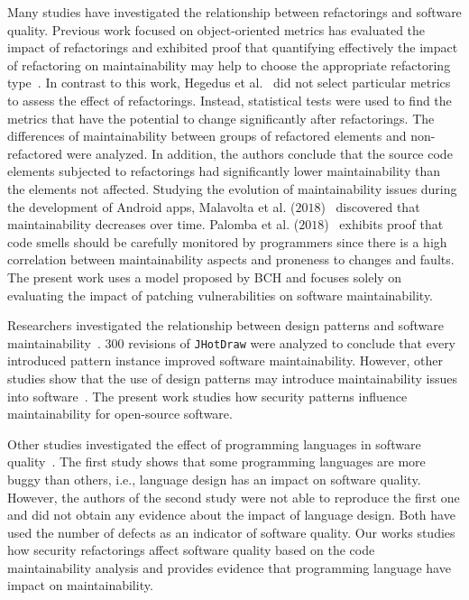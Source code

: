 \documentclass[10pt,conference]{IEEEtran}
\newcommand\Sof[1]{\nb{Sofia}{red}{#1}}
\newcommand\Rui[1]{\nb{Rui}{blue}{#1}}
\begin{document}
Many studies have investigated the relationship between refactorings and
software quality. Previous work focused on object-oriented metrics \Rui{?}\Sof{Better?} has evaluated the
impact of refactorings and exhibited proof that quantifying effectively the
impact of refactoring on maintainability may help to choose the appropriate
refactoring type~\cite{1167822}. In contrast to this work, Hegedus et
al.~\cite{HEGEDUS2018313} did not select particular metrics to assess the effect
of refactorings. Instead, statistical tests were used to find the metrics that
have the potential to change significantly after refactorings. The differences
of maintainability between groups of refactored elements and non-refactored were
analyzed. In addition, the authors conclude that the source code elements
subjected to refactorings had significantly lower maintainability than the
elements not affected. Studying the evolution of maintainability issues during
the development of Android apps, Malavolta et al. ($2018$)~\cite{8530041}
discovered that maintainability decreases over time. Palomba et al.
($2018$)~\cite{Palomba:2018:DIM:3231288.3231337} exhibits proof that code smells
should be carefully monitored by programmers since there is a high correlation
between maintainability aspects and proneness to changes and faults. The present
work uses a model proposed by BCH and focuses solely on evaluating the impact of
patching vulnerabilities on software maintainability.

Researchers investigated the relationship between design patterns and software
maintainability~\cite{10.1007/978-3-642-35267-6-18}. $300$ revisions of
\texttt{JHotDraw} were analyzed to conclude that every introduced pattern
instance improved software maintainability. However, other studies show that the
use of design patterns may introduce maintainability issues into
software~\cite{4493325}. The present work studies how security patterns
influence maintainability for open-source software.

Other studies investigated the effect of programming languages in software
quality~\cite{Ray:2017:LSP:3144574.3126905, 2019arXiv190110220B}. The first
study shows that some programming languages are more buggy than others, i.e.,
language design has an impact on software quality. However, the authors of the
second study were not able to reproduce the first one and did not obtain any
evidence about the impact of language design. Both have used the number of
defects as an indicator of software quality. Our works studies how
security refactorings affect software quality based on the code maintainability
analysis and provides evidence that programming language have impact on
maintainability.
\end{document}
